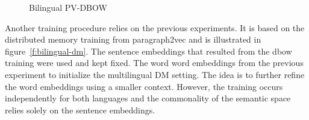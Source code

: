 \begin{figure}

\center

\caption{Bilingual PV-DBOW}
\label{f:bilingual_dbow}
\end{figure}




Another training procedure relies on the previous experiments. It is based on the distributed memory training from paragraph2vec and  is illustrated in figure~\ref{f:bilingual-dm}. 
The sentence embeddings that resulted from the dbow training were used and kept fixed. The word word embeddings from the previous experiment to initialize the multilingual DM setting. The idea is to further refine the word embeddings using a smaller context. However, the training occurs independently for both languages and the commonality of the semantic space relies solely on the sentence embeddings.

\begin{figure*}

\center

\caption{Bilingual PV-DM}
\label{f:bilingual-dm}
\end{figure*}

